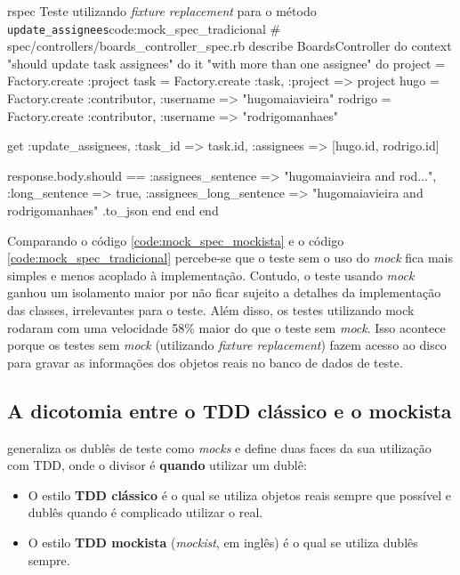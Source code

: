 \begin{mycode}{rspec}%
{Teste utilizando \textit{fixture replacement} para o método \texttt{update\_assignees}}{code:mock_spec_tradicional}
# spec/controllers/boards_controller_spec.rb
describe BoardsController do
  context "should update task assignees" do
    it "with more than one assignee" do
      project = Factory.create :project
      task = Factory.create :task, :project => project
      hugo = Factory.create :contributor, :username => "hugomaiavieira"
      rodrigo = Factory.create :contributor, :username => "rodrigomanhaes"

      get :update_assignees, :task_id => task.id, :assignees => [hugo.id, rodrigo.id]

      response.body.should ==
        { :assignees_sentence => "hugomaiavieira and rod...",
          :long_sentence => true,
          :assignees_long_sentence => "hugomaiavieira and rodrigomanhaes" }.to_json
    end
  end
end
\end{mycode}

Comparando o código \ref{code:mock_spec_mockista} e o código \ref{code:mock_spec_tradicional} percebe-se que o teste sem o uso do \textit{mock} fica mais simples e menos acoplado à implementação. Contudo, o teste usando \textit{mock} ganhou um isolamento maior por não ficar sujeito a detalhes da implementação das classes, irrelevantes para o teste. Além disso, os testes utilizando mock rodaram com uma velocidade 58\% maior do que o teste sem \textit{mock}. Isso acontece porque os testes sem \textit{mock} (utilizando \textit{fixture replacement}) fazem acesso ao disco para gravar as informações dos objetos reais no banco de dados de teste.


\subsection{A dicotomia entre o TDD clássico e o mockista}
\label{sub:tdd_classico_e_mockista}

 generaliza os dublês de teste como \textit{mocks} e define duas faces da sua utilização com TDD, onde o divisor é \textbf{quando} utilizar um dublê:

\begin{itemize}
  \item O estilo \textbf{TDD clássico} é o qual se utiliza objetos reais sempre que possível e dublês quando é complicado utilizar o real.

  \item O estilo \textbf{TDD mockista} (\textit{mockist}, em inglês) é o qual se utiliza dublês sempre.
\end{itemize}

